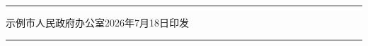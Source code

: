 \documentclass[linespread=1.81, twoside]{ctexart}
\begin{document}
\vfill
\begingroup{}\setlength{\parindent}{0pt}%
\rule{\textwidth}{0.35mm}\par
\vspace{0.2\baselineskip}
\hspace{1\ccwd}示例市人民政府办公室\hfill 2026年7月18日印发\hspace*{1\ccwd}\par
\vspace{0.2\baselineskip}
\rule{\textwidth}{0.35mm}\par
\endgroup
\end{document}
